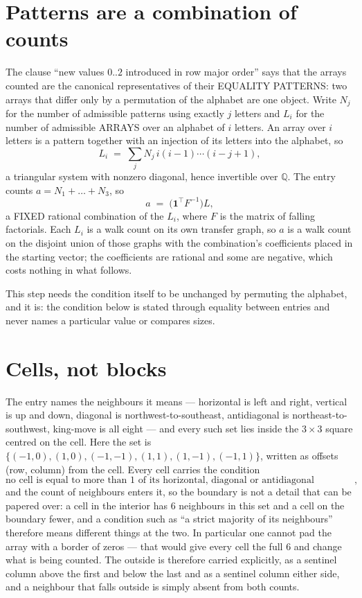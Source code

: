 \documentclass[11pt,a4paper]{article}
\theoremstyle{plain}
\theoremstyle{definition}
\begin{document}
\section{Patterns are a combination of counts}

The clause ``new values $0..2$ introduced in row major order'' says that the arrays
counted are the canonical representatives of their EQUALITY PATTERNS: two arrays that differ
only by a permutation of the alphabet are one object. Write $N_j$ for the number of admissible
patterns using exactly $j$ letters and $L_i$ for the number of admissible ARRAYS over an
alphabet of $i$ letters. An array over $i$ letters is a pattern together with an injection of
its letters into the alphabet, so
\[
L_i\;=\;\sum_{j}N_j\,i(i-1)\cdots(i-j+1),
\]
a triangular system with nonzero diagonal, hence invertible over $\mathbb{Q}$. The entry
counts $a=N_1+\dots+N_{3}$, so
\[
a\;=\;\bigl(\mathbf{1}^{\!\top}F^{-1}\bigr)L ,
\]
a FIXED rational combination of the $L_i$, where $F$ is the matrix of falling factorials.
Each $L_i$ is a walk count on its own transfer graph, so $a$ is a walk count on the disjoint
union of those graphs with the combination's coefficients placed in the starting vector; the
coefficients are rational and some are negative, which costs nothing in what follows.

This step needs the condition itself to be unchanged by permuting the alphabet, and it is:
the condition below is stated through equality between entries and never names a particular
value or compares sizes.

\section{Cells, not blocks}

The entry names the neighbours it means --- horizontal is left and right, vertical is up and
down, diagonal is northwest-to-southeast, antidiagonal is northeast-to-southwest, king-move is
all eight --- and every such set lies inside the $3\times3$ square centred on the cell. Here
the set is $\{(-1,0), (1,0), (-1,-1), (1,1), (1,-1), (-1,1)\}$, written as offsets (row, column) from the cell. Every cell carries
the condition
\[
\text{no cell is equal to more than 1 of its horizontal, diagonal or antidiagonal neighbours},
\]
and the count of neighbours enters it, so the boundary is not a detail that can be papered
over: a cell in the interior has $6$ neighbours in this set and a cell on the boundary
fewer, and a condition such as ``a strict majority of its neighbours'' therefore means
different things at the two. In particular one cannot pad the array with a border of zeros ---
that would give every cell the full $6$ and change what is being counted. The outside is
therefore carried
explicitly, as a sentinel column above the first and below the last and as a sentinel column
either side, and a neighbour that falls outside is simply absent from both counts.
\end{document}
